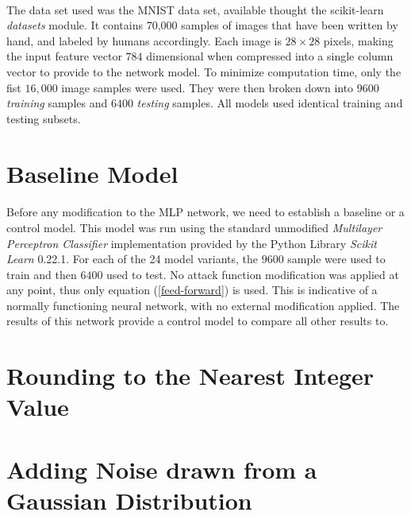 \documentclass[12pt,letterpaper]{article}
\begin{document}
\paragraph*{}The data set used was the MNIST data set, available thought the scikit-learn \textit{datasets} module. It contains 70,000 samples of images that have been written by hand, and labeled by humans accordingly. Each image is $28 \times 28$ pixels, making the input feature vector $784$ dimensional when compressed into a single column vector to provide to the network model. To minimize computation time, only the fist $16,000$ image samples were used. They were then broken down into $9600$ \textit{training} samples and $6400$ \textit{testing} samples. All models used identical training and testing subsets.


\section*{Baseline Model}

\paragraph*{}Before any modification to the MLP network, we need to establish a baseline or a control model. This model was run using the standard unmodified \textit{Multilayer Perceptron Classifier} implementation provided by the Python Library \textit{Scikit Learn} 0.22.1. For each of the 24 model variants, the $9600$ sample were used to train and then $6400$ used to test. No attack function modification was applied at any point, thus only equation (\ref{feed-forward}) is used. This is indicative of a normally functioning neural network, with no external modification applied. The results of this network provide a control model to compare all other results to.


\section*{Rounding to the Nearest Integer Value}



\section*{Adding Noise drawn from a Gaussian Distribution}
\end{document}

